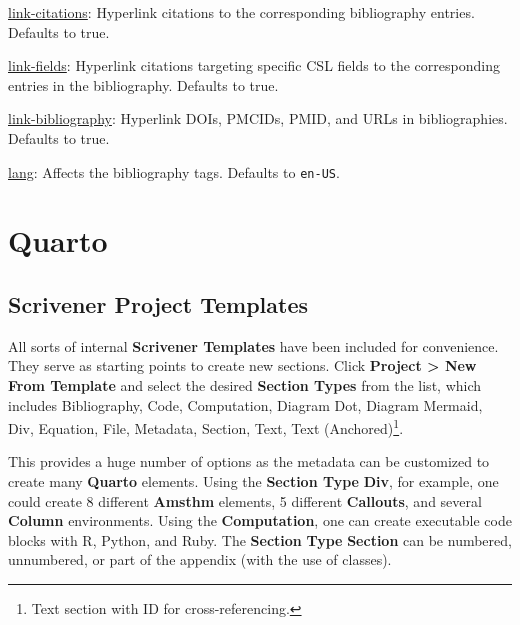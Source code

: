 \documentclass[
  10pt,
  oneside,
  cleardoublepage=empty,
  numbers=noenddot,
  titlepage,
  toclink=all,
  toc=bibliography,
  headinclude,
  footinclude]{scrbook}
\theoremstyle{plain}
\theoremstyle{plain}
\theoremstyle{definition}
\theoremstyle{definition}
\theoremstyle{plain}
\theoremstyle{plain}
\theoremstyle{definition}
\theoremstyle{plain}
\theoremstyle{remark}
\begin{document}
\begin{tcolorbox}[enhanced jigsaw, bottomrule=.15mm, bottomtitle=1mm, rightrule=.15mm, opacityback=0, coltitle=black, colback=white, left=2mm, arc=.35mm, colbacktitle=quarto-callout-note-color!10!white, breakable, toptitle=1mm, colframe=quarto-callout-note-color-frame, toprule=.15mm, titlerule=0mm, title=\textcolor{quarto-callout-note-color}{\faInfo}\hspace{0.5em}{Bibliography links}, leftrule=.75mm, opacitybacktitle=0.6]

\ul{link-citations}: Hyperlink citations to the corresponding
bibliography entries. Defaults to true.

\ul{link-fields}: Hyperlink citations targeting specific CSL fields to
the corresponding entries in the bibliography. Defaults to true.

\ul{link-bibliography}: Hyperlink DOIs, PMCIDs, PMID, and URLs in
bibliographies. Defaults to true.

\ul{lang}: Affects the bibliography tags. Defaults to \texttt{en-US}.

\end{tcolorbox}

\chapter{Quarto}\label{quarto}

\section{Scrivener Project Templates}\label{scrivener-project-templates}

All sorts of internal \textbf{Scrivener Templates} have been included
for convenience. They serve as starting points to create new sections.
Click \textbf{Project \textgreater{} New From Template} and select the
desired \textbf{Section Types} from the list, which includes
Bibliography, Code, Computation, Diagram Dot, Diagram Mermaid, Div,
Equation, File, Metadata, Section, Text, Text (Anchored)\footnote{Text
  section with ID for cross-referencing.}.

This provides a huge number of options as the metadata can be customized
to create many \textbf{Quarto} elements. Using the \textbf{Section Type}
\textbf{Div}, for example, one could create 8 different \textbf{Amsthm}
elements, 5 different \textbf{Callouts}, and several \textbf{Column}
environments. Using the \textbf{Computation}, one can create executable
code blocks with R, Python, and Ruby. The \textbf{Section} \textbf{Type}
\textbf{Section} can be numbered, unnumbered, or part of the appendix
(with the use of classes).
\end{document}
